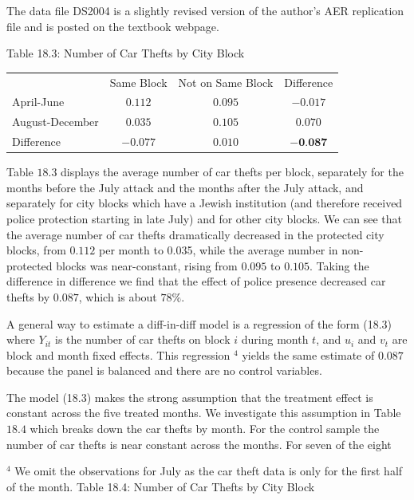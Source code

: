 \documentclass[10pt]{article}
\begin{document}
The data file DS2004 is a slightly revised version of the author's AER replication file and is posted on the textbook webpage.

Table 18.3: Number of Car Thefts by City Block

\begin{tabular}{lccc}
\hline\hline
 & Same Block & Not on Same Block & Difference \\
\cline { 2 - 4 }
April-June & $0.112$ & $0.095$ & $-0.017$ \\
August-December & $0.035$ & $0.105$ & $0.070$ \\
Difference & $-0.077$ & $0.010$ & $-\mathbf{0 . 0 8 7}$ \\
\hline
\end{tabular}

Table $18.3$ displays the average number of car thefts per block, separately for the months before the July attack and the months after the July attack, and separately for city blocks which have a Jewish institution (and therefore received police protection starting in late July) and for other city blocks. We can see that the average number of car thefts dramatically decreased in the protected city blocks, from $0.112$ per month to 0.035, while the average number in non-protected blocks was near-constant, rising from $0.095$ to $0.105$. Taking the difference in difference we find that the effect of police presence decreased car thefts by $0.087$, which is about $78 \%$.

A general way to estimate a diff-in-diff model is a regression of the form (18.3) where $Y_{i t}$ is the number of car thefts on block $i$ during month $t$, and $u_{i}$ and $v_{t}$ are block and month fixed effects. This regression $^{4}$ yields the same estimate of $0.087$ because the panel is balanced and there are no control variables.

The model (18.3) makes the strong assumption that the treatment effect is constant across the five treated months. We investigate this assumption in Table $18.4$ which breaks down the car thefts by month. For the control sample the number of car thefts is near constant across the months. For seven of the eight

${ }^{4}$ We omit the observations for July as the car theft data is only for the first half of the month. Table 18.4: Number of Car Thefts by City Block
\end{document}
